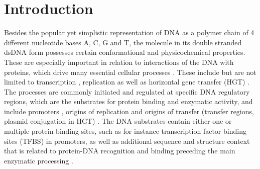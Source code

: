 \documentclass[10pt]{article}
\begin{document}
\section{Introduction}
Besides the popular yet simplistic representation of DNA as a polymer chain of 4 different nucleotide bases A, C, G and T, the molecule in its double stranded dsDNA form possesses certain conformational and physicochemical properties. These are especially important in relation to interactions of the DNA with proteins, which drive many essential cellular processes \cite{Rohs2009-hm,Zrimec2015-xf,Zrimec2018-lx}. These include but are not limited to transcription \cite{Rohs2009-hm}, replication \cite{Chen2012-gd} as well as horizontal gene transfer (HGT) \cite{Zrimec2018-lx,Zrimec2020-wx}. The processes are commonly initiated and regulated at specific DNA regulatory regions, which are the substrates for protein binding and enzymatic activity, and include promoters \cite{Watson2008-dt}, origins of replication \cite{Chen2012-gd} and origins of transfer (transfer regions, plasmid conjugation in HGT) \cite{De_La_Cruz2010-xj}. The DNA substrates contain either one or multiple protein binding sites, such as for instance transcription factor binding sites (TFBS) in promoters, as well as additional sequence and structure context that is related to protein-DNA recognition and binding preceding the main enzymatic processing \cite{Levo2015-iu,Marcovitz2013-kg,Zrimec2018-lx}.
\end{document}
